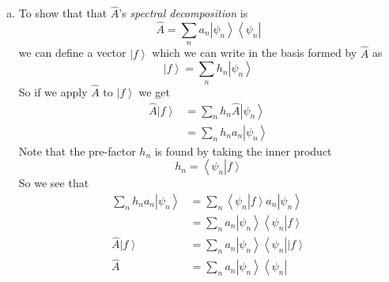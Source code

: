 \documentclass[11pt]{article}
\numberwithin{equation}{section}
\newcommand{\norm}[2]{\left\langle{#1}\right|\left.{#2}\right\rangle}
\newcommand{\ket}[1]{\left|{#1}\right\rangle}
\newcommand{\bra}[1]{\left\langle{#1}\right|}
\begin{document}
\begin{enumerate}[(a)]
\item
To show that that $\hat{A}$'s \emph{spectral decomposition} is
$$\hat{A} = \sum_na_n\ket{\psi_n}\bra{\psi_n}$$
we can define a vector $\ket{f}$ which we can write in the basis formed by $\hat{A}$ as
$$\ket{f} = \sum_nh_n\ket{\psi_n}$$
So if we apply $\hat{A}$ to $\ket{f}$ we get
\begin{align*}
\hat{A}\ket{f} &= \sum_nh_n\hat{A}\ket{\psi_n}\\
&= \sum_nh_na_n\ket{\psi_n}
\end{align*}
Note that the pre-factor $h_n$ is found by taking the inner product 
$$h_n = \norm{\psi_n}{f}$$
So we see that
\begin{align*}
\sum_nh_na_n\ket{\psi_n} &= \sum_n\norm{\psi_n}{f}a_n\ket{\psi_n}\\
&= \sum_na_n\ket{\psi_n}\norm{\psi_n}{f}\\
\hat{A}\ket{f} &= \sum_na_n\ket{\psi_n}\bra{\psi_n}\ket{f}\\
\hat{A} &= \sum_na_n\ket{\psi_n}\bra{\psi_n}
\end{align*}
\end{enumerate}
\end{document}
